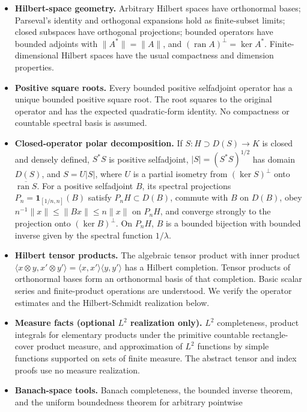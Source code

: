 \documentclass[
  11pt,
]{article}
\providecommand{\tightlist}{%
  \setlength{\itemsep}{0pt}\setlength{\parskip}{0pt}}
\begin{document}
\begin{itemize}
\tightlist
\item
  \textbf{Hilbert-space geometry.} Arbitrary Hilbert spaces have
  orthonormal bases; Parseval's identity and orthogonal expansions hold
  as finite-subset limits; closed subspaces have orthogonal projections;
  bounded operators have bounded adjoints with \(\|A^*\|=\|A\|\), and
  \((\operatorname{ran}A)^\perp=\ker A^*\). Finite-dimensional Hilbert
  spaces have the usual compactness and dimension properties.
\item
  \textbf{Positive square roots.} Every bounded positive selfadjoint
  operator has a unique bounded positive square root. The root squares
  to the original operator and has the expected quadratic-form identity.
  No compactness or countable spectral basis is assumed.
\item
  \textbf{Closed-operator polar decomposition.} If
  \(S:H\supset D(S)\to K\) is closed and densely defined, \(S^*S\) is
  positive selfadjoint, \(|S|=(S^*S)^{1/2}\) has domain \(D(S)\), and
  \(S=U|S|\), where \(U\) is a partial isometry from \((\ker S)^\perp\)
  onto \(\overline{\operatorname{ran}S}\). For a positive selfadjoint
  \(B\), its spectral projections \(P_n=\mathbf1_{[1/n,n]}(B)\) satisfy
  \(P_nH\subset D(B)\), commute with \(B\) on \(D(B)\), obey
  \(n^{-1}\|x\|\leq\|Bx\|\leq n\|x\|\) on \(P_nH\), and converge
  strongly to the projection onto \((\ker B)^\perp\). On \(P_nH\), \(B\)
  is a bounded bijection with bounded inverse given by the spectral
  function \(1/\lambda\).
\item
  \textbf{Hilbert tensor products.} The algebraic tensor product with
  inner product
  \(\langle x\otimes y,x'\otimes y'\rangle=\langle x,x'\rangle\langle y,y'\rangle\)
  has a Hilbert completion. Tensor products of orthonormal bases form an
  orthonormal basis of that completion. Basic scalar series and
  finite-product operations are understood. We verify the operator
  estimates and the Hilbert-Schmidt realization below.
\item
  \textbf{Measure facts (optional \(L^2\) realization only).} \(L^2\)
  completeness, product integrals for elementary products under the
  primitive countable rectangle-cover product measure, and approximation
  of \(L^2\) functions by simple functions supported on sets of finite
  measure. The abstract tensor and index proofs use no measure
  realization.
\item
  \textbf{Banach-space tools.} Banach completeness, the bounded inverse
  theorem, and the uniform boundedness theorem for arbitrary pointwise

\end{itemize}
\end{document}
